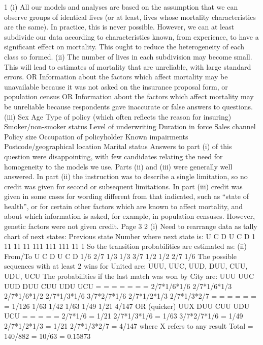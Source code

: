 1
(i)
All our models and analyses are based on the assumption that we can observe groups
of identical lives (or at least, lives whose mortality characteristics are the same).
In practice, this is never possible.
However, we can at least subdivide our data according to characteristics known, from
experience, to have a significant effect on mortality.
This ought to reduce the heterogeneity of each class so formed.
(ii)
The number of lives in each subdivision may become small. This will lead to
estimates of mortality that are unreliable, with large standard errors.
OR
Information about the factors which affect mortality may be unavailable because it
was not asked on the insurance proposal form, or population census
OR
Information about the factors which affect mortality may be unreliable because
respondents gave inaccurate or false answers to questions.
(iii)
Sex
Age
Type of policy (which often reflects the reason for insuring)
Smoker/non-smoker status
Level of underwriting
Duration in force
Sales channel
Policy size
Occupation of policyholder
Known impairments
Postcode/geographical location
Marital status
Answers to part (i) of this question were disappointing, with few candidates relating the need
for homogeneity to the models we use. Parts (ii) and (iii) were generally well answered. In
part (ii) the instruction was to describe a single limitation, so no credit was given for second
or subsequent limitations. In part (iii) credit was given in some cases for wording different
from that indicated, such as “state of health”, or for certain other factors which are known to
affect mortality, and about which information is asked, for example, in population censuses.
However, genetic factors were not given credit.
Page 3%
2
(i)
Need to rearrange data as tally chart of next states:
Previous state Number where next state is:
U
C
D
U
C
D 1
11
11
11
111
111
111
11
1
So the transition probabilities are estimated as:
(ii)
From/To U C D
U
C
D 1/6
2/7
1/3 1/3
3/7
1/2 1/2
2/7
1/6
The possible sequences with at least 2 wins for United are:
UUU, UUC, UUD, DUU, CUU, UDU, UCU
The probabilities if the last match was won by City are:
UUU
UUC
UUD
DUU
CUU
UDU
UCU
=
=
=
=
=
=
=
2/7*1/6*1/6
2/7*1/6*1/3
2/7*1/6*1/2
2/7*1/3*1/6
3/7*2/7*1/6
2/7*1/2*1/3
2/7*1/3*2/7
=
=
=
=
=
=
=
1/126
1/63
1/42
1/63
1/49
1/21
4/147
OR (quicker)
UUX
DUU
CUU
UDU
UCU
=
=
=
=
=
2/7*1/6 = 1/21
2/7*1/3*1/6 = 1/63
3/7*2/7*1/6 = 1/49
2/7*1/2*1/3 = 1/21
2/7*1/3*2/7 = 4/147
where X refers to any result
Total = 140/882 = 10/63 = 0.15873
